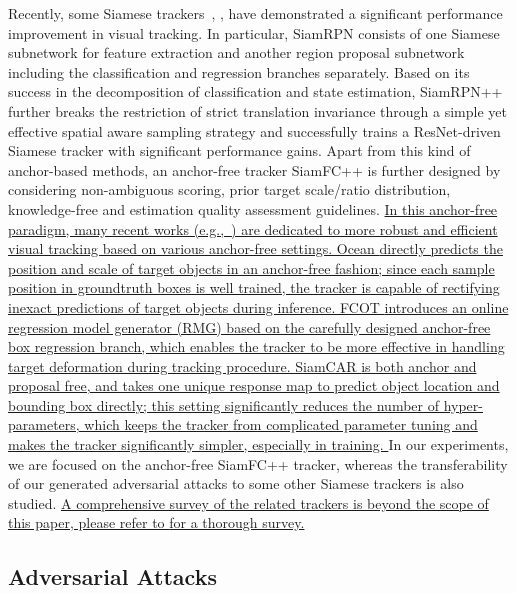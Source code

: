\documentclass[journal]{IEEEtran}
\newcommand{\eg}{e.g.}
\begin{document}
Recently, some Siamese trackers~\cite{SiamFC++}, \uline{\cite{zhang2020ocean, cui2020fully, 9157720}}, \cite{SiamRPN,SiamRPN++} have demonstrated a significant performance improvement in visual tracking. 
In particular, SiamRPN \cite{SiamRPN} consists of one Siamese subnetwork for feature extraction and another region proposal subnetwork including the classification and regression branches separately. Based on its success in the decomposition of classification and state estimation, SiamRPN++ \cite{SiamRPN++} further breaks the restriction of strict translation invariance through a simple yet effective spatial aware sampling strategy and successfully trains a ResNet-driven Siamese tracker with significant performance gains. Apart from this kind of anchor-based methods, an anchor-free tracker SiamFC++ \cite{SiamFC++} is further designed by considering non-ambiguous scoring, prior target scale/ratio distribution, knowledge-free and estimation quality assessment guidelines.
\uline{In this anchor-free paradigm, many recent works (\eg,~\cite{zhang2020ocean, cui2020fully, 9157720}) are dedicated to more robust and efficient visual tracking based on various anchor-free settings.
Ocean \cite{zhang2020ocean} directly predicts the position and scale of target objects in an anchor-free fashion; since each sample position in groundtruth boxes is well trained, the tracker is capable of rectifying inexact predictions of target objects during inference.
FCOT \cite{cui2020fully} introduces an online regression model generator (RMG) based on the carefully designed anchor-free box regression branch, which enables the tracker to be more effective in handling target deformation during tracking procedure.
SiamCAR \cite{9157720} is both anchor and proposal free, and takes one unique response map to predict object location and bounding box directly; this setting significantly reduces the number of hyper-parameters, which keeps the tracker from complicated parameter tuning and makes the
tracker significantly simpler, especially in training.
}
In our experiments, we are focused on the anchor-free SiamFC++ tracker, whereas the transferability of our generated adversarial attacks to some other Siamese trackers is also studied.
\uline{
A comprehensive survey of the related trackers is beyond the scope of this paper, please refer to \cite{9339950} for a thorough survey.} 
\vspace{-5mm}

\subsection{Adversarial Attacks}
\end{document}

